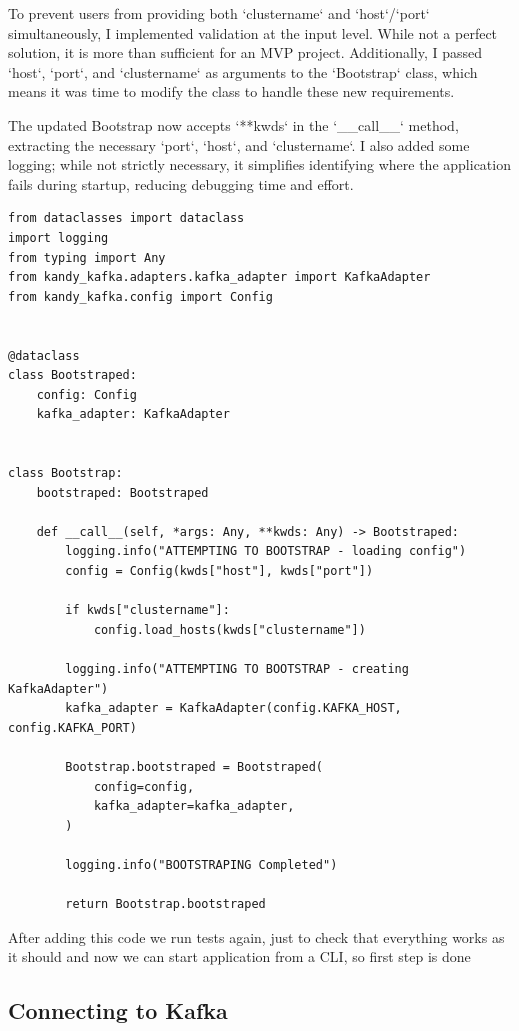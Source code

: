 \documentclass[10pt , a4paper]{report}
\newenvironment{code}{\captionsetup{type=listing}}{}
\begin{document}
To prevent users from providing both `clustername` and `host`/`port` simultaneously, I implemented validation at the input level. While not a perfect solution, it is more than sufficient for an MVP project. Additionally, I passed `host`, `port`, and `clustername` as arguments to the `Bootstrap` class, which means it was time to modify the class to handle these new requirements.

The updated Bootstrap now accepts `**kwds` in the `\_\_call\_\_` method, extracting the necessary `port`, `host`, and `clustername`. I also added some logging; while not strictly necessary, it simplifies identifying where the application fails during startup, reducing debugging time and effort.

\begin{code}
  \begin{verbatim}
from dataclasses import dataclass
import logging
from typing import Any
from kandy_kafka.adapters.kafka_adapter import KafkaAdapter
from kandy_kafka.config import Config


@dataclass
class Bootstraped:
    config: Config
    kafka_adapter: KafkaAdapter


class Bootstrap:
    bootstraped: Bootstraped

    def __call__(self, *args: Any, **kwds: Any) -> Bootstraped:
        logging.info("ATTEMPTING TO BOOTSTRAP - loading config")
        config = Config(kwds["host"], kwds["port"])

        if kwds["clustername"]:
            config.load_hosts(kwds["clustername"])

        logging.info("ATTEMPTING TO BOOTSTRAP - creating KafkaAdapter")
        kafka_adapter = KafkaAdapter(config.KAFKA_HOST, config.KAFKA_PORT)

        Bootstrap.bootstraped = Bootstraped(
            config=config,
            kafka_adapter=kafka_adapter,
        )

        logging.info("BOOTSTRAPING Completed")

        return Bootstrap.bootstraped
  \end{verbatim}
\end{code}

After adding this code we run tests again, just to check that everything works as it should and now we can start application from a CLI, so first step is done

\subsection{Connecting to Kafka}
\end{document}
